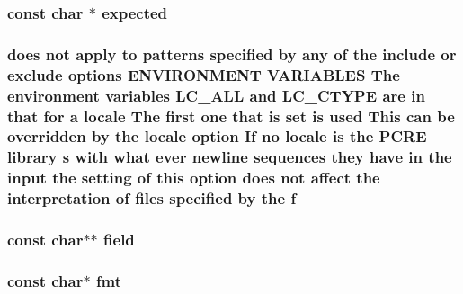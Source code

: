 \subsubsection[{\texorpdfstring{expected}{expected}}]{\setlength{\rightskip}{0pt plus 5cm}const char $\ast$ expected}\hypertarget{group__APACHE__CORE__DAEMON_ga4ccff52c6aab3f0dc41108e8905ab106}{}\label{group__APACHE__CORE__DAEMON_ga4ccff52c6aab3f0dc41108e8905ab106}
\subsubsection[{\texorpdfstring{f}{f}}]{ does {\bf not} apply {\bf to} {\bf patterns} {\bf specified} by {\bf any} {\bf of} the {\bf include} {\bf or} {\bf exclude} {\bf options} E\+N\+V\+I\+R\+O\+N\+M\+E\+NT V\+A\+R\+I\+A\+B\+L\+ES The {\bf environment} {\bf variables} L\+C\+\_\+\+A\+LL and L\+C\+\_\+\+C\+T\+Y\+PE {\bf are} {\bf in} that for {\bf a} {\bf locale} The {\bf first} one that {\bf is} {\bf set} {\bf is} {\bf used} This {\bf can} {\bf be} overridden by the {\bf locale} {\bf option} If no {\bf locale} {\bf is} the {\bf P\+C\+RE} {\bf library} {\bf s} {\bf with} {\bf what} {\bf ever} {\bf newline} sequences they have {\bf in} the {\bf input} the {\bf setting} {\bf of} {\bf this} {\bf option} does {\bf not} affect the interpretation {\bf of} {\bf files} {\bf specified} by the f}\hypertarget{group__APACHE__CORE__DAEMON_ga588c778c1c1509e472f22dc36efb005e}{}\label{group__APACHE__CORE__DAEMON_ga588c778c1c1509e472f22dc36efb005e}
\subsubsection[{\texorpdfstring{field}{field}}]{\setlength{\rightskip}{0pt plus 5cm}const char$\ast$$\ast$ field}\hypertarget{group__APACHE__CORE__DAEMON_gae5c4b068a26ad890b3f11ac8dc993347}{}\label{group__APACHE__CORE__DAEMON_gae5c4b068a26ad890b3f11ac8dc993347}
\subsubsection[{\texorpdfstring{fmt}{fmt}}]{ const char$\ast$ fmt}\hypertarget{group__APACHE__CORE__DAEMON_gacf53f259c50e76452489d799cd9f0e20}{}\label{group__APACHE__CORE__DAEMON_gacf53f259c50e76452489d799cd9f0e20}
